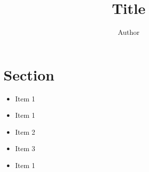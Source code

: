 \documentclass{custom-article}
\title{Title}
\author{Author}
\date{\the\year}
\begin{document}
\maketitle

\newpage

\tableofcontents

\newpage

\section{Section}

\begin{itemize}
        \item Item 1 \cite{vapnik2000nature}
\end{itemize}
\begin{itemize}
        \item Item 1
        \item Item 2
        \item Item 3
\end{itemize}
\begin{itemize}
        \item Item 1
\end{itemize}

\newpage


\end{document}
